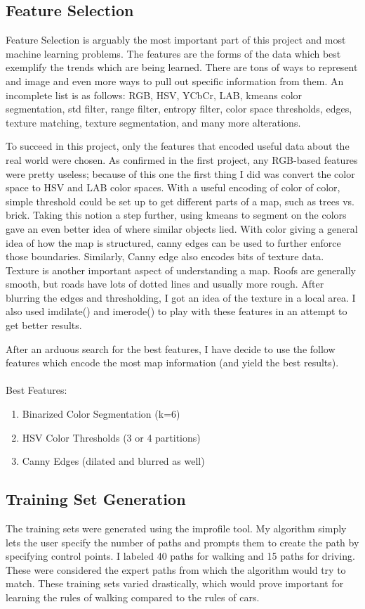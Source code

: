 \documentclass{article}
\begin{document}
\subsection{Feature Selection}
\par
Feature Selection is arguably the most important part of this project and most machine learning problems. The features are the forms of the data which best exemplify the trends which are being learned. There are tons of ways to represent and image and even more ways to pull out specific information from them. An incomplete list is as follows: RGB, HSV, YCbCr, LAB, kmeans color segmentation, std filter, range filter, entropy filter, color space thresholds, edges, texture matching, texture segmentation, and many more alterations. 
\par
To succeed in this project, only the features that encoded useful data about the real world were chosen. As confirmed in the first project, any RGB-based features were pretty useless; because of this one the first thing I did was convert the color space to HSV and LAB color spaces. With a useful encoding of color of color, simple threshold could be set up to get different parts of a map, such as trees vs. brick. Taking this notion a step further, using kmeans to segment on the colors gave an even better idea of where similar objects lied. With color giving a general idea of how the map is structured, canny edges can be used to further enforce those boundaries. Similarly, Canny edge also encodes bits of texture data. Texture is another important aspect of understanding a map. Roofs are generally smooth, but roads have lots of dotted lines and usually more rough. After blurring the edges and thresholding, I got an idea of the texture in a local area. I also used imdilate() and imerode() to play with these features in an attempt to get better results. 
\par
After an arduous search for the best features, I have decide to use the follow features which encode the most map information (and yield the best results).
\\
\\
Best Features:
\begin{enumerate}
\item Binarized Color Segmentation (k=6)
\item HSV Color Thresholds (3 or 4 partitions)
\item Canny Edges (dilated and blurred as well)
\end{enumerate}

\subsection{Training Set Generation}
\par
The training sets were generated using the improfile tool. My algorithm simply lets the user specify the number of paths and prompts them to create the path by specifying control points. I labeled 40 paths for walking and 15 paths for driving. These were considered the expert paths from which the algorithm would try to match. These training sets varied drastically, which would prove important for learning the rules of walking compared to the rules of cars. 
\end{document}
